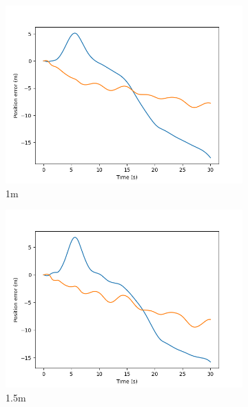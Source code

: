 \documentclass[class=article, crop=false]{standalone}
\begin{document}
\begin{figure}
\begin{subfigure}[b]{0.48\textwidth}
        \includegraphics{scenario1/rov-50m/1.0m/rov_position_error_controlled}
        \caption{1m}
        \label{}
    \end{subfigure}
    \hfill
    \begin{subfigure}[b]{0.48\textwidth}
        \centering
        \includegraphics{scenario1/rov-50m/1.5m/rov_position_error_controlled}
        \caption{1.5m}
        \label{}
    \end{subfigure}
    \vfill
    \begin{subfigure}[b]{0.48\textwidth}
        \centering

\end{subfigure}
\end{figure}
\end{document}
